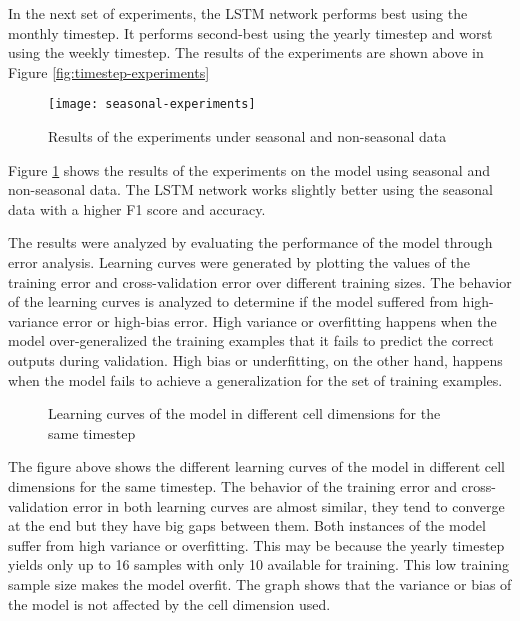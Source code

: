 \documentclass[a0]{sciposter}
\begin{document}
\begin{multicols}{2}
    In the next set of experiments, the LSTM network performs best using the monthly timestep. It performs second-best using the yearly timestep and worst using the weekly timestep. The results of the experiments are shown above in Figure \ref{fig:timestep-experiments}

    \begin{figure}[ht]
    \centering
    \texttt{[image: seasonal-experiments]}
    \caption{Results of  the experiments under seasonal and non-seasonal data}
    \label{fig:seasonal-experiments}
    \end{figure}

    Figure \ref{fig:seasonal-experiments} shows the results of the experiments on the model using seasonal and non-seasonal data. The LSTM network works slightly better using the seasonal data with a higher F1 score and accuracy.

    The results were analyzed by evaluating the performance of the model through error analysis. Learning curves were generated by plotting the values of the training error and cross-validation error over different training sizes. The behavior of the learning curves is analyzed to determine if the model suffered from high-variance error or high-bias error. High variance or overfitting happens when the model over-generalized the training examples that it fails to predict the correct outputs during validation. High bias or underfitting, on the other hand, happens when the model fails to achieve a generalization for the set of training examples.

    \begin{figure}
    \label{fig:dimension-learning-curve}
    \centering     %
    \caption{Learning curves of the model in different cell dimensions for the same timestep}
    \end{figure}

    The figure above shows the different learning curves of the model in different cell dimensions for the same timestep. The behavior of the training error and cross-validation error in both learning curves are almost similar, they tend to converge at the end but they have big gaps between them. Both instances of the model suffer from high variance or overfitting. This may be because the yearly timestep yields only up to 16 samples with only 10 available for training. This low training sample size makes the model overfit. The graph shows that the variance or bias of the model is not affected by the cell dimension used.


\end{multicols}
\end{document}
